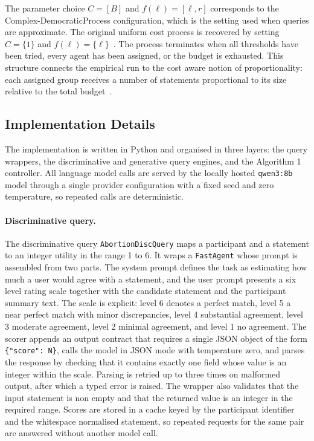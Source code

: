 \documentclass[letterpaper,11pt]{article}
\theoremstyle{plain}
\theoremstyle{definition}
\begin{document}
The parameter choice $C=[B]$ and $f(\ell)=[\ell,r]$ corresponds to the Complex-DemocraticProcess configuration, which is the setting used when queries are approximate. The original uniform cost process is recovered by setting $C=\{1\}$ and $f(\ell)=\{\ell\}$~\citep{fish2026gsc}. The process terminates when all thresholds have been tried, every agent has been assigned, or the budget is exhausted. This structure connects the empirical run to the cost aware notion of proportionality: each assigned group receives a number of statements proportional to its size relative to the total budget~\citep{aziz2017jr,boehmer2025nextgen}.

\subsection{Implementation Details}

The implementation is written in Python and organised in three layers: the query wrappers, the discriminative and generative query engines, and the Algorithm 1 controller. All language model calls are served by the locally hosted \texttt{qwen3:8b} model through a single provider configuration with a fixed seed and zero temperature, so repeated calls are deterministic.

\paragraph{Discriminative query.}
The discriminative query \texttt{AbortionDiscQuery} maps a participant and a statement to an integer utility in the range 1 to 6. It wraps a \texttt{FastAgent} whose prompt is assembled from two parts. The system prompt defines the task as estimating how much a user would agree with a statement, and the user prompt presents a six level rating scale together with the candidate statement and the participant summary text. The scale is explicit: level 6 denotes a perfect match, level 5 a near perfect match with minor discrepancies, level 4 substantial agreement, level 3 moderate agreement, level 2 minimal agreement, and level 1 no agreement. The scorer appends an output contract that requires a single JSON object of the form \texttt{\{"score": N\}}, calls the model in JSON mode with temperature zero, and parses the response by checking that it contains exactly one field whose value is an integer within the scale. Parsing is retried up to three times on malformed output, after which a typed error is raised. The wrapper also validates that the input statement is non empty and that the returned value is an integer in the required range. Scores are stored in a cache keyed by the participant identifier and the whitespace normalised statement, so repeated requests for the same pair are answered without another model call.
\end{document}
